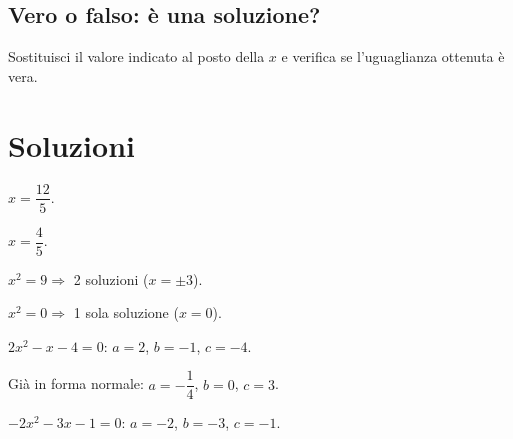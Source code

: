 \documentclass[11pt]{report}
\begin{document}
\section{Vero o falso: è una soluzione?}

\begin{mdframed}
Sostituisci il valore indicato al posto della $x$ e verifica se l'uguaglianza ottenuta è vera.
\end{mdframed}

\begin{exercise}[\onestar]
\begin{truthorfalse}
\end{truthorfalse}
\end{exercise}

\chapter{Soluzioni}

\begin{expsolution}[1]
$x=\dfrac{12}{5}$.
\end{expsolution}

\begin{expsolution}[2]
$x=\dfrac45$.
\end{expsolution}

\begin{expsolution}[3]
$x^2=9 \Rightarrow$ 2 soluzioni ($x=\pm3$).
\end{expsolution}

\begin{expsolution}[4]
$x^2=0 \Rightarrow$ 1 sola soluzione ($x=0$).
\end{expsolution}

\begin{expsolution}[5]
$2x^2-x-4=0$: \quad $a=2$, $b=-1$, $c=-4$.
\end{expsolution}

\begin{expsolution}[6]
Già in forma normale: \quad $a=-\dfrac14$, $b=0$, $c=3$.
\end{expsolution}

\begin{expsolution}[7]
$-2x^2-3x-1=0$: \quad $a=-2$, $b=-3$, $c=-1$.
\end{expsolution}
\end{document}
